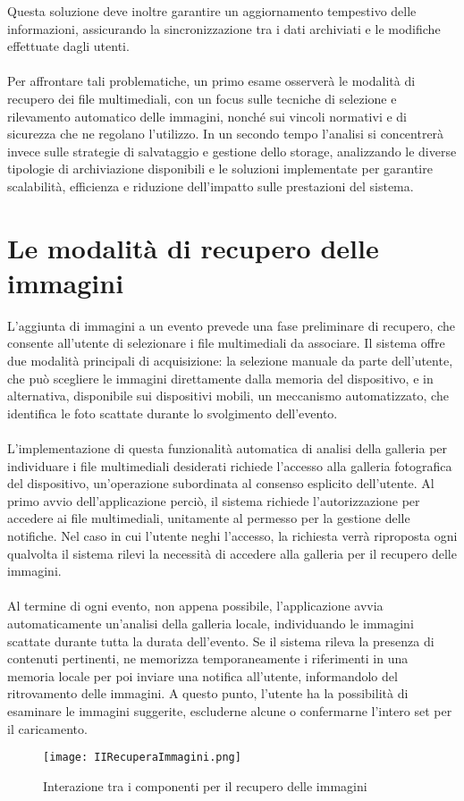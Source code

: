 Questa soluzione deve inoltre garantire un aggiornamento tempestivo delle informazioni, assicurando la sincronizzazione tra i dati archiviati e le modifiche effettuate dagli utenti.\\
\\
Per affrontare tali problematiche, un primo esame osserverà le modalità di recupero dei file multimediali,
con un focus sulle tecniche di selezione e rilevamento automatico delle immagini, nonché sui vincoli normativi e di sicurezza che ne regolano l’utilizzo.
In un secondo tempo l’analisi si concentrerà invece sulle strategie di salvataggio e gestione dello storage,
analizzando le diverse tipologie di archiviazione disponibili e le soluzioni implementate per garantire scalabilità, efficienza e riduzione dell’impatto sulle prestazioni del sistema.


\clearpage


\section{Le modalità di recupero delle immagini }

L’aggiunta di immagini a un evento prevede una fase preliminare di recupero, che consente all’utente di selezionare i file multimediali da associare. 
Il sistema offre due modalità principali di acquisizione: la selezione manuale da parte dell’utente, che può scegliere le immagini direttamente dalla memoria del dispositivo, 
e in alternativa, disponibile sui dispositivi mobili, un meccanismo automatizzato, che identifica le foto scattate durante lo svolgimento dell’evento.\\
\\
L’implementazione di questa funzionalità automatica di analisi della galleria per individuare i file multimediali desiderati  richiede l’accesso alla galleria fotografica del dispositivo, 
un’operazione subordinata al consenso esplicito dell’utente. 
Al primo avvio dell’applicazione perciò, il sistema richiede l’autorizzazione per accedere ai file multimediali, unitamente al permesso per la gestione delle notifiche. 
Nel caso in cui l’utente neghi l’accesso, la richiesta verrà riproposta ogni qualvolta il sistema rilevi la necessità di accedere alla galleria per il recupero delle immagini.\\
\\
Al termine di ogni evento, non appena possibile, l’applicazione avvia automaticamente un’analisi della galleria locale, individuando le immagini scattate durante tutta la durata dell’evento. 
Se il sistema rileva la presenza di contenuti pertinenti, ne memorizza temporaneamente i riferimenti in una memoria locale per poi inviare una notifica all’utente, 
informandolo del ritrovamento delle immagini. A questo punto, l’utente ha la possibilità di esaminare le immagini suggerite, escluderne alcune o confermarne l’intero set per il caricamento.\\
\clearpage
\begin{figure}[htb]
    \centering
    \texttt{[image: IIRecuperaImmagini.png]}
    \caption{Interazione tra i componenti per il recupero delle immagini}
\end{figure}

